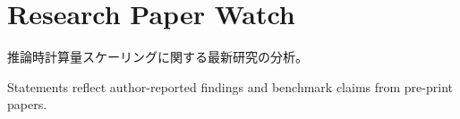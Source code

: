 \section{Research Paper Watch}
推論時計算量スケーリングに関する最新研究の分析。
\begin{claimboundary}
Statements reflect author-reported findings and benchmark claims from pre-print papers.
\end{claimboundary}
